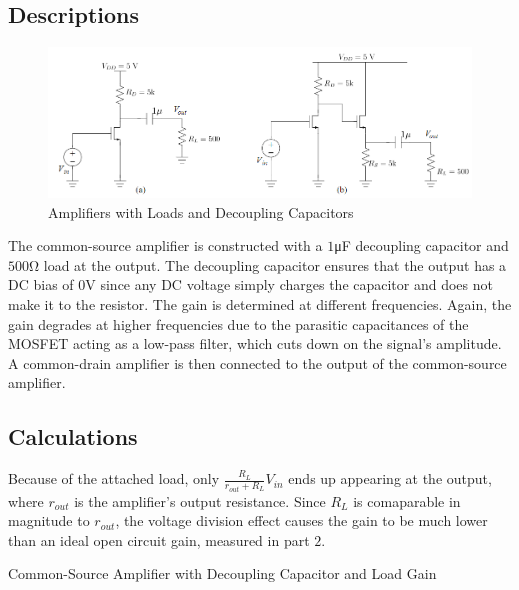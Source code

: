 \subsection{Descriptions}

\FloatBarrier

\begin{figure}[h!]
	\centering
	\includegraphics[scale=0.60]{./images/circuit_3.PNG}
	\caption{Amplifiers with Loads and Decoupling Capacitors}
	\label{fig:circuit_3}
\end{figure}

\FloatBarrier

The common-source amplifier is constructed with a $1$\si{\micro\farad} decoupling capacitor and $500$\si{\ohm} load at the output.
The decoupling capacitor ensures that the output has a DC bias of $0$\si{\volt} since any DC voltage simply charges the capacitor and does not make it to the resistor.
The gain is determined at different frequencies.
Again, the gain degrades at higher frequencies due to the parasitic capacitances of the MOSFET acting as a low-pass filter, which cuts down on the signal's amplitude.
A common-drain amplifier is then connected to the output of the common-source amplifier.

\subsection{Calculations}

Because of the attached load, only $\frac{R_{L}}{r_{out} + R_{L}}V_{in}$ ends up appearing at the output, where $r_{out}$ is the amplifier's output resistance.
Since $R_{L}$ is comaparable in magnitude to $r_{out}$, the voltage division effect causes the gain to be much lower than an ideal open circuit gain, measured in part $2$.

\FloatBarrier

\begin{table}[h!]
	\centering
	\caption{Common-Source Amplifier with Decoupling Capacitor and Load Gain}
	\label{tab:gain_part3}
\end{table}

